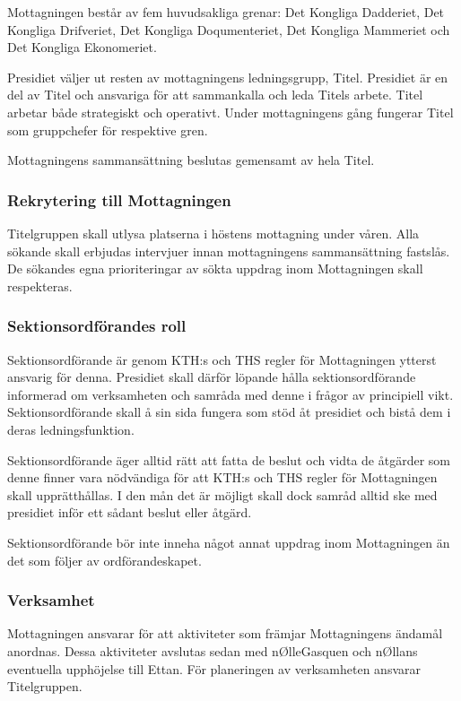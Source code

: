 \documentclass{dgovdoc}
\begin{document}
Mottagningen består av fem huvudsakliga grenar: Det Kongliga Dadderiet, Det Kongliga Drifveriet, Det Kongliga Doqumenteriet, Det Kongliga Mammeriet och Det Kongliga Ekonomeriet.

Presidiet väljer ut resten av mottagningens ledningsgrupp, Titel. Presidiet är en del av Titel och ansvariga för att sammankalla och leda Titels arbete. Titel arbetar både strategiskt och operativt. Under mottagningens gång fungerar Titel som gruppchefer för respektive gren.

Mottagningens sammansättning beslutas gemensamt av hela Titel.

\subsubsection{Rekrytering till Mottagningen}

Titelgruppen skall utlysa platserna i höstens mottagning under våren. Alla
sökande skall erbjudas intervjuer innan mottagningens sammansättning fastslås.
De sökandes egna prioriteringar av sökta uppdrag inom Mottagningen skall
respekteras.

\subsubsection{Sektionsordförandes roll}

Sektionsordförande är genom KTH:s och THS regler för Mottagningen ytterst
ansvarig för denna. Presidiet skall därför löpande hålla sektionsordförande
informerad om verksamheten och samråda med denne i frågor av principiell vikt.
Sektionsordförande skall å sin sida fungera som stöd åt presidiet och bistå dem
i deras ledningsfunktion.

Sektionsordförande äger alltid rätt att fatta de beslut och vidta de åtgärder
som denne finner vara nödvändiga för att KTH:s och THS regler för Mottagningen
skall upprätthållas. I den mån det är möjligt skall dock samråd alltid ske med
presidiet inför ett sådant beslut eller åtgärd.

Sektionsordförande bör inte inneha något annat uppdrag inom Mottagningen än det
som följer av ordförandeskapet.

\subsubsection{Verksamhet}

Mottagningen ansvarar för att aktiviteter som främjar Mottagningens ändamål
anordnas. Dessa aktiviteter avslutas sedan med nØlleGasquen och nØllans
eventuella upphöjelse till Ettan. För planeringen av verksamheten ansvarar
Titelgruppen.
\end{document}
